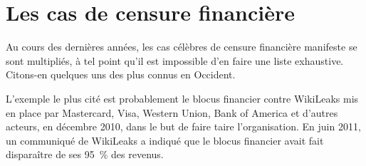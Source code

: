\section*{Les cas de censure financière}


Au cours des dernières années, les cas célèbres de censure financière manifeste se sont multipliés, à tel point qu'il est impossible d'en faire une liste exhaustive. Citons-en quelques uns des plus connus en Occident.


L'exemple le plus cité est probablement le blocus financier contre WikiLeaks mis en place par Mastercard, Visa, Western Union, Bank of America et d'autres acteurs, en décembre 2010, dans le but de faire taire l'organisation. En juin 2011, un communiqué de WikiLeaks a indiqué que le blocus financier avait fait disparaître de ses 95~\% des revenus.

